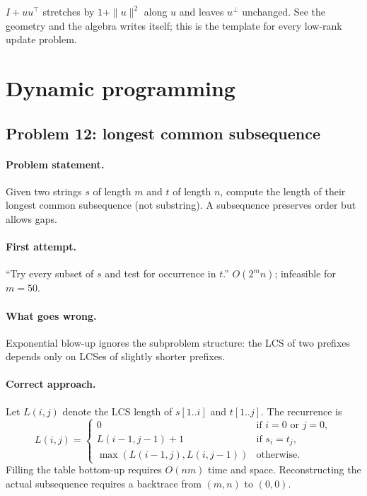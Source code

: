 \begin{intuitionbox}
$I + uu^\top$ stretches by $1 + \|u\|^2$ along $u$ and leaves
$u^\perp$ unchanged.  See the geometry and the algebra writes
itself; this is the template for every low-rank update problem.
\end{intuitionbox}

\section{Dynamic programming}
\label{sec:dp-problems}

\subsection{Problem 12: longest common subsequence}
\label{sec:lcs}

\paragraph{Problem statement.}
Given two strings $s$ of length $m$ and $t$ of length $n$, compute
the length of their longest common subsequence (not substring).
A subsequence preserves order but allows gaps.

\paragraph{First attempt.}
``Try every subset of $s$ and test for occurrence in $t$.''
$O(2^m n)$; infeasible for $m = 50$.

\paragraph{What goes wrong.}
Exponential blow-up ignores the subproblem structure: the LCS of
two prefixes depends only on LCSes of slightly shorter prefixes.

\paragraph{Correct approach.}
Let $L(i, j)$ denote the LCS length of $s[1..i]$ and $t[1..j]$.
The recurrence is
\[
L(i, j) =
\begin{cases}
0 & \text{if } i = 0 \text{ or } j = 0, \\
L(i-1, j-1) + 1 & \text{if } s_i = t_j, \\
\max(L(i-1, j), L(i, j-1)) & \text{otherwise}.
\end{cases}
\]
Filling the table bottom-up requires $O(nm)$ time and space.
Reconstructing the actual subsequence requires a backtrace from
$(m,n)$ to $(0,0)$.

